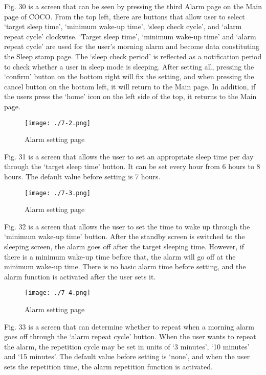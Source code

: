 \documentclass[conference]{IEEEtran}
\begin{document}
Fig. 30 is a screen that can be seen by pressing the third Alarm page on the Main page of COCO. From the top left, there are buttons that allow user to select ‘target sleep time’, ‘minimum wake-up time’, ‘sleep check cycle’, and ‘alarm repeat cycle’ clockwise.
‘Target sleep time’, ‘minimum wake-up time’ and ‘alarm repeat cycle’ are used for the user's morning alarm and become data constituting the Sleep stamp page. The ‘sleep check period’ is reflected as a notification period to check whether a user in sleep mode is sleeping. After setting all, pressing the ‘confirm’ button on the bottom right will fix the setting, and when pressing the cancel button on the bottom left, it will return to the Main page. In addition, if the users press the ‘home’ icon on the left side of the top, it returns to the Main page.

\begin{figure}[H]
\texttt{[image: ./7-2.png]}
\centering
\caption{Alarm setting page}
\end{figure}

Fig. 31 is a screen that allows the user to set an appropriate sleep time per day through the ‘target sleep time’ button. It can be set every hour from 6 hours to 8 hours. The default value before setting is 7 hours.

\begin{figure}[H]
\texttt{[image: ./7-3.png]}
\centering
\caption{Alarm setting page}
\end{figure}

Fig. 32 is a screen that allows the user to set the time to wake up through the ‘minimum wake-up time’ button. After the standby screen is switched to the sleeping screen, the alarm goes off after the target sleeping time. However, if there is a minimum wake-up time before that, the alarm will go off at the minimum wake-up time. There is no basic alarm time before setting, and the alarm function is activated after the user sets it.

\begin{figure}[H]
\texttt{[image: ./7-4.png]}
\centering
\caption{Alarm setting page}
\end{figure}

Fig. 33 is a screen that can determine whether to repeat when a morning alarm goes off through the ‘alarm repeat cycle’ button. When the user wants to repeat the alarm, the repetition cycle may be set in units of ‘3 minutes’, ‘10 minutes’ and ‘15 minutes’. The default value before setting is ‘none’, and when the user sets the repetition time, the alarm repetition function is activated.
\end{document}
